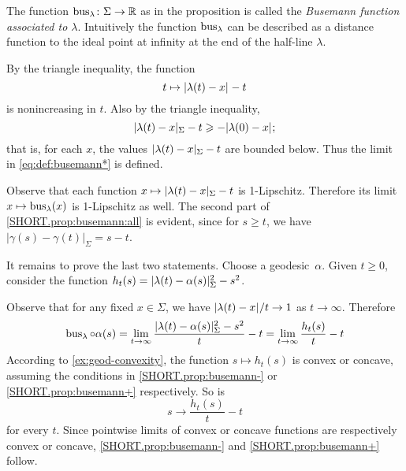 The function  $\bus_\lambda\:\Sigma\z\to \mathbb{R}$ as in the proposition is called  the
\emph{Busemann function associated to $\lambda$}.
Intuitively the function $\mathop{\rm bus}\nolimits_\lambda$ can be described as a distance function to the ideal point at infinity at the end of the half-line $\lambda$.

By the triangle inequality, the function 
\[t\mapsto\dist{\lambda(t)}{x}{}- t\] is nonincreasing in $t$.  
Also by the triangle inequality,
\[\dist{\lambda(t)}{x}{\Sigma}- t\ge-\dist{\lambda(0)}{x}{};\]
that is, for each $x$, the values $\dist{\lambda(t)}{x}{\Sigma}- t$ are bounded below.
Thus the limit in \ref{eq:def:busemann*} is defined.

Observe that each function $x\mapsto \dist{\lambda(t)}{x}{\Sigma}- t$ is 1-Lipschitz.
Therefore its limit $x\mapsto\mathop{\rm bus}\nolimits_\lambda(x)$ is 1-Lipschitz as well.
The second part of \ref{SHORT.prop:busemann:all} is evident, since for $s \geq t$, we have $|  \gamma (s) - \gamma (t) |_{\Sigma} = s-t$.


It remains to prove the last two statements.
Choose a geodesic~$\alpha$.
Given $t\ge 0$, consider the function $h_t(s)=\dist{\lambda(t)}{\alpha(s)}{\Sigma}^2-s^2$.


Observe that for any fixed $x\in\Sigma$, we have $\dist{\lambda(t)}{x}{}/t\to 1$ as $t\to\infty$.
Therefore
\[
\mathop{\rm bus}\nolimits_\lambda\circ\alpha(s)
=
\lim_{t\to\infty}\frac{| \lambda (t) - \alpha (s)  |_{\Sigma}^2 - s^2 }{t} -t
=
\lim_{t\to\infty}\frac{h_t(s)}{t} -t
\]
According to \ref{ex:geod-convexity}, the function 
$s\mapsto h_t(s)$ is convex or concave, assuming the conditions in  \ref{SHORT.prop:busemann-} or \ref{SHORT.prop:busemann+} respectively. So is
\[ s \to \dfrac{h_t(s)}{t} -t \]
for every $t$. Since pointwise limits of convex or concave functions are respectively convex or concave, \ref{SHORT.prop:busemann-} and \ref{SHORT.prop:busemann+} follow.
\qeds


